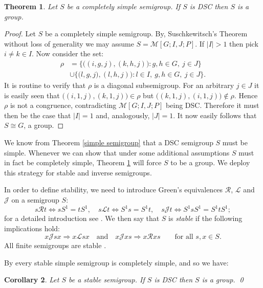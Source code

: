 \documentclass[a4paper, 12pt,reqno]{amsart}
\theoremstyle{plain}
\newtheorem{thm}{Theorem}[section]
\newtheorem{cor}[thm]{Corollary}
\theoremstyle{definition}
\theoremstyle{remark}
\newcommand{\R}{\mathcal{R}}
\renewcommand{\L}{\mathcal{L}}
\newcommand{\J}{\mathcal{J}}
\begin{document}
\begin{thm}\label{Completely simple}
    Let $S$ be a completely simple semigroup. If $S$ is DSC then $S$ is a group.
\end{thm}

\begin{proof}
    Let $S$ be a completely simple semigroup.
    By, Suschkewitsch's Theorem without loss of generality we may assume $S = \mathcal{M}[G;I,J;P]$.
    If $|I| > 1$ then pick $i \neq k \in I$. Now consider the set:
        \begin{align*}
        \rho & = \bigl\{  \bigl((i,g,j),(k,h,j)\bigr) \colon g,h\in G,\ j\in J\bigr\}\\ 
        &\cup \bigl\{ \bigl(l,g,j),(l,h,j)\bigr) \colon l \in I,\ g,h \in G ,\ j \in J \bigr\}.
    \end{align*}
    It is routine to verify that $\rho$ is a diagonal subsemigroup.
    For an arbitrary $j\in J$  it is easily seen that $\bigl((i,1,j),(k,1,j)\bigr) \in \rho$ but 
    $\bigl((k,1,j),(i,1,j)\bigr) \notin \rho$. 
    Hence $\rho$ is not a congruence, contradicting $\mathcal{M}[G;I,J;P]$ being DSC. 
    Therefore it must then be the case that $|I| = 1$ and, analogously, $|J| = 1$.
    It now easily follows that $S\cong G$, a group.
\end{proof}

We know from Theorem \ref{simple semigroup} that a DSC semigroup $S$ must be simple. 
Whenever we can show that under some additional assumptions $S$ must in fact be completely simple, Theorem \ref{Completely simple} will force $S$ to be a group. 
We deploy this strategy for stable and inverse semigroups.

In order to define stability, we need to introduce Green's equivalences $\R$, $\L$ and $\J$ on a semigroup $S$:
\[
s\R t \Leftrightarrow sS^1=tS^1,\quad s\L t \Leftrightarrow S^1s=S^1t,\quad
s\J t \Leftrightarrow S^1sS^1=S^1tS^1;
\]
for a detailed introduction see \cite[Section 2.1]{Ho95}.
We then say that $S$ is \emph{stable} if the following implications hold:
\[
x \J sx \Rightarrow x \L sx \quad\text{and}\quad x \J xs \Rightarrow x \R xs \qquad\text{for all 
$s,x\in S$.}
\]
All finite semigroups are stable \cite[Theorem A.2.4]{RS09}.  

By \cite[Theorem A.4.15]{RS09} every stable simple semigroup is completely simple, and so we have:

\begin{cor}\label{stable semigroup}
    Let $S$ be a stable semigroup. If $S$ is DSC then $S$ is a group. \qed
\end{cor}
\end{document}
